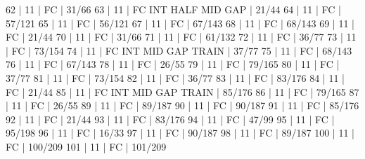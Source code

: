 62    |  11    |    FC                                        | 31/66   
63    |  11    |    FC  INT  HALF            MID  GAP         | 21/44   
64    |  11    |    FC                                        | 57/121   
65    |  11    |    FC                                        | 56/121   
67    |  11    |    FC                                        | 67/143   
68    |  11    |    FC                                        | 68/143   
69    |  11    |    FC                                        | 21/44   
70    |  11    |    FC                                        | 31/66   
71    |  11    |    FC                                        | 61/132   
72    |  11    |    FC                                        | 36/77   
73    |  11    |    FC                                        | 73/154   
74    |  11    |    FC  INT                  MID  GAP  TRAIN  | 37/77   
75    |  11    |    FC                                        | 68/143   
76    |  11    |    FC                                        | 67/143   
78    |  11    |    FC                                        | 26/55   
79    |  11    |    FC                                        | 79/165   
80    |  11    |    FC                                        | 37/77   
81    |  11    |    FC                                        | 73/154   
82    |  11    |    FC                                        | 36/77   
83    |  11    |    FC                                        | 83/176   
84    |  11    |    FC                                        | 21/44   
85    |  11    |    FC  INT                  MID  GAP  TRAIN  | 85/176   
86    |  11    |    FC                                        | 79/165   
87    |  11    |    FC                                        | 26/55   
89    |  11    |    FC                                        | 89/187   
90    |  11    |    FC                                        | 90/187   
91    |  11    |    FC                                        | 85/176   
92    |  11    |    FC                                        | 21/44   
93    |  11    |    FC                                        | 83/176   
94    |  11    |    FC                                        | 47/99   
95    |  11    |    FC                                        | 95/198   
96    |  11    |    FC                                        | 16/33   
97    |  11    |    FC                                        | 90/187   
98    |  11    |    FC                                        | 89/187   
100   |  11    |    FC                                        | 100/209   
101   |  11    |    FC                                        | 101/209   

